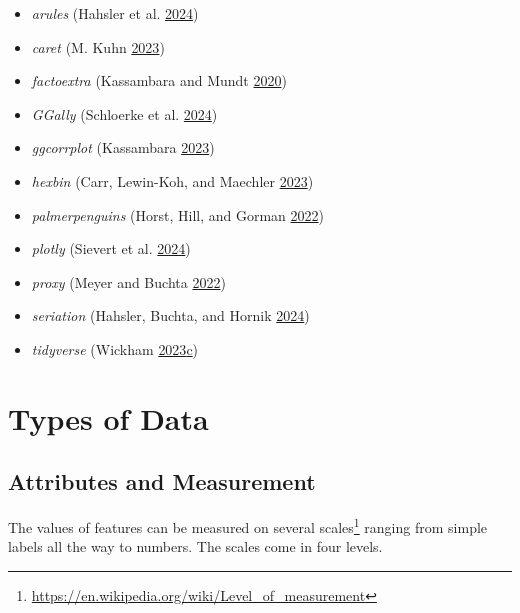 \documentclass[
  notitlepage]{book}
\DeclareRobustCommand{\href}[2]{#2\footnote{\url{#1}}}
\providecommand{\tightlist}{%
  \setlength{\itemsep}{0pt}\setlength{\parskip}{0pt}}
\begin{document}
\begin{itemize}
\tightlist
\item
  \emph{arules} (Hahsler et al. \protect\hyperlink{ref-R-arules}{2024})
\item
  \emph{caret} (M. Kuhn \protect\hyperlink{ref-R-caret}{2023})
\item
  \emph{factoextra} (Kassambara and Mundt \protect\hyperlink{ref-R-factoextra}{2020})
\item
  \emph{GGally} (Schloerke et al. \protect\hyperlink{ref-R-GGally}{2024})
\item
  \emph{ggcorrplot} (Kassambara \protect\hyperlink{ref-R-ggcorrplot}{2023})
\item
  \emph{hexbin} (Carr, Lewin-Koh, and Maechler \protect\hyperlink{ref-R-hexbin}{2023})
\item
  \emph{palmerpenguins} (Horst, Hill, and Gorman \protect\hyperlink{ref-R-palmerpenguins}{2022})
\item
  \emph{plotly} (Sievert et al. \protect\hyperlink{ref-R-plotly}{2024})
\item
  \emph{proxy} (Meyer and Buchta \protect\hyperlink{ref-R-proxy}{2022})
\item
  \emph{seriation} (Hahsler, Buchta, and Hornik \protect\hyperlink{ref-R-seriation}{2024})
\item
  \emph{tidyverse} (Wickham \protect\hyperlink{ref-R-tidyverse}{2023}\protect\hyperlink{ref-R-tidyverse}{c})
\end{itemize}

\hypertarget{types-of-data}{%
\section{Types of Data}\label{types-of-data}}

\hypertarget{attributes-and-measurement}{%
\subsection{Attributes and Measurement}\label{attributes-and-measurement}}

The values of features can be measured on \href{https://en.wikipedia.org/wiki/Level_of_measurement}{several scales}
ranging from
simple labels all the way to numbers. The scales come in four levels.
\end{document}
